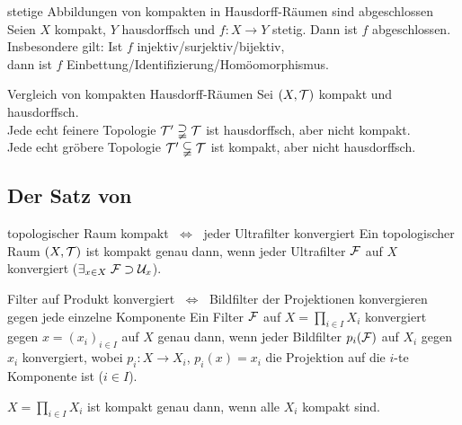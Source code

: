 \begin{Satz}{stetige Abbildungen von kompakten in Hausdorff-Räumen sind
             abgeschlossen} \\
    Seien $X$ kompakt, $Y$ hausdorffsch und $f\colon X \rightarrow Y$ stetig.
    Dann ist $f$ abgeschlossen. \\
    Insbesondere gilt:
    Ist $f$ injektiv/surjektiv/bijektiv, \\
    dann ist $f$ Einbettung/Identifizierung/Homöomorphismus.
\end{Satz}

\begin{Satz}{Vergleich von kompakten Hausdorff-Räumen}
    Sei $(X, \mathcal{T})$ kompakt und hausdorffsch. \\
    Jede echt feinere Topologie $\mathcal{T}' \supsetneqq \mathcal{T}$ ist hausdorffsch,
    aber nicht kompakt. \\
    Jede echt gröbere Topologie $\mathcal{T}' \subsetneqq \mathcal{T}$ ist kompakt,
    aber nicht hausdorffsch.
\end{Satz}

\subsection{%
    Der Satz von %
}

\begin{Satz}{topologischer Raum kompakt $\;\Leftrightarrow\;$
             jeder Ultrafilter konvergiert}
    Ein topologischer Raum $(X, \mathcal{T})$ ist kompakt genau dann, wenn
    jeder Ultrafilter $\mathcal{F}$ auf $X$ konvergiert
    ($\exists_{x \in X}\; \mathcal{F} \supset \mathcal{U}_x$).
\end{Satz}

\begin{Lemma}{Filter auf Produkt konvergiert $\;\Leftrightarrow\;$
              Bildfilter der Projektionen konvergieren gegen
              jede einzelne Komponente}
    Ein Filter $\mathcal{F}$ auf $X = \prod_{i \in I} X_i$ konvergiert gegen
    $x = (x_i)_{i \in I}$ auf $X$ genau dann, wenn jeder
    Bildfilter $p_i(\mathcal{F})$ auf $X_i$ gegen $x_i$ konvergiert, wobei
    $p_i\colon X \rightarrow X_i$, $p_i(x) = x_i$
    die Projektion auf die $i$-te Komponente ist ($i \in I$).
\end{Lemma}

\begin{Satz}{}
    $X = \prod_{i \in I} X_i$ ist kompakt genau dann, wenn alle $X_i$ kompakt
    sind.
\end{Satz}

